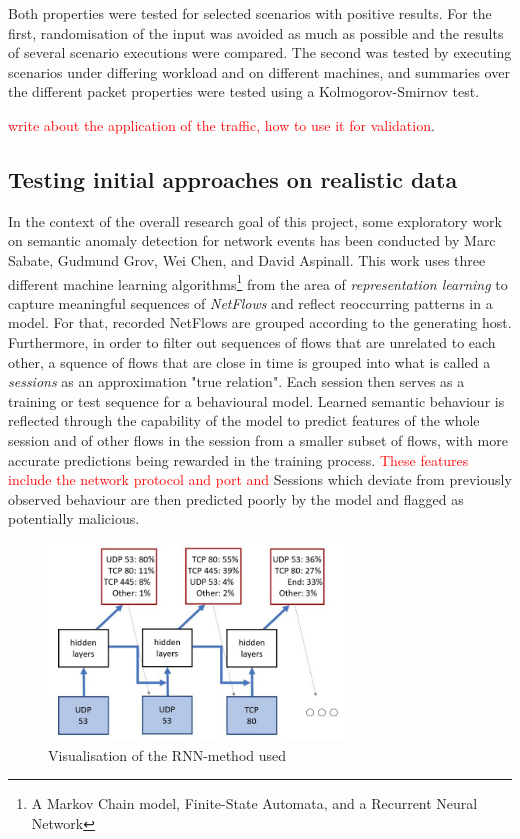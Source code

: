 \documentclass[a4paper,12pt,twoside]{report}
\begin{document}
Both properties were tested for selected scenarios with positive results. For the first, randomisation of the input was avoided as much as possible and the results of several scenario executions were compared. The second was tested by executing scenarios under differing workload and on different machines, and summaries over the different packet properties were tested using a Kolmogorov-Smirnov test. 


\textcolor{red}{write about the application of the traffic, how to use it for validation}.


\subsection{Testing initial approaches on realistic data}\label{Prevwork}

In the context of the overall research goal of this project, some exploratory work on semantic anomaly detection for network events has been conducted by Marc Sabate, Gudmund Grov, Wei Chen, and David Aspinall. This work uses three different machine learning algorithms\footnote{A Markov Chain model, Finite-State Automata, and a Recurrent Neural Network} from the area of \textit{representation learning} to capture meaningful sequences of \textit{NetFlows} and reflect reoccurring patterns in a model. For that, recorded NetFlows are grouped according to the generating host. Furthermore, in order to filter out sequences of flows that are unrelated to each other, a squence of flows that are close in time is grouped into what is called a \textit{sessions} as an approximation "true relation". Each session then serves as a training or test sequence for a behavioural model. Learned semantic behaviour is reflected through the capability of the model to predict features of the whole session and of other flows in the session from a smaller subset of flows, with more accurate predictions being rewarded in the training process. \textcolor{red}{These features include the network protocol and port and} Sessions which deviate from previously observed behaviour are then predicted poorly by the model and flagged as potentially malicious.

\begin{figure}
\centering
\includegraphics[width=0.7\textwidth]{images/RNN.jpg}
\caption{Visualisation of the RNN-method used}\label{RNN}
\end{figure}
\end{document}
